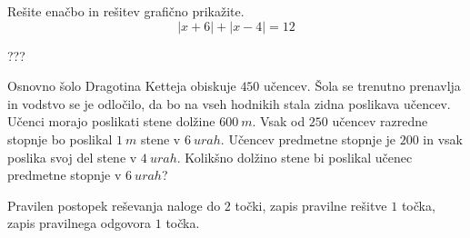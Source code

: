 \documentclass[addpoints,12pt]{exam}
\begin{document}
\begin{questions}
    
    






\newpage
    \question[7]
    Rešite enačbo in rešitev grafično prikažite.
    $$\left\lvert x+6 \right\rvert + \left\lvert x-4 \right\rvert=12 $$
    
    
    \begin{solution}[10cm]
        ???
    \end{solution}

    \newpage

    
    




    \question[5]
    Osnovno šolo Dragotina Ketteja obiskuje $450$ učencev. Šola se trenutno prenavlja in vodstvo se je odločilo, da bo na vseh hodnikih stala zidna poslikava učencev.
    Učenci morajo poslikati stene dolžine $600~m$. Vsak od $250$ učencev razredne stopnje bo poslikal $1~m$ stene v $6~urah$. Učencev predmetne stopnje je $200$ in vsak poslika svoj del stene v $4~urah$.
    Kolikšno dolžino stene bi poslikal učenec predmetne stopnje v $6~urah$?
    
    
    \begin{solution}[3cm]
        Pravilen postopek reševanja naloge do $2$ točki, zapis pravilne rešitve $1$ točka, zapis pravilnega odgovora $1$ točka.
    \end{solution}


\end{questions}
\end{document}
